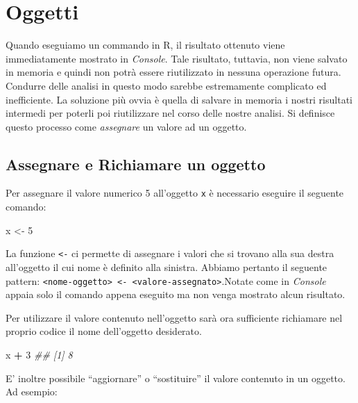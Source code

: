 \documentclass[
]{book}
\newenvironment{Shaded}{\begin{snugshade}}{\end{snugshade}}
\newcommand{\CommentTok}[1]{\textcolor[rgb]{0.56,0.35,0.01}{\textit{#1}}}
\newcommand{\DecValTok}[1]{\textcolor[rgb]{0.00,0.00,0.81}{#1}}
\newcommand{\NormalTok}[1]{#1}
\newcommand{\OperatorTok}[1]{\textcolor[rgb]{0.81,0.36,0.00}{\textbf{#1}}}
\newcommand{\StringTok}[1]{\textcolor[rgb]{0.31,0.60,0.02}{#1}}
\begin{document}
\hypertarget{objects-section}{%
\section{Oggetti}\label{objects-section}}

Quando eseguiamo un commando in R, il risultato ottenuto viene immediatamente mostrato in \emph{Console}. Tale risultato, tuttavia, non viene salvato in memoria e quindi non potrà essere riutilizzato in nessuna operazione futura. Condurre delle analisi in questo modo sarebbe estremamente complicato ed inefficiente. La soluzione più ovvia è quella di salvare in memoria i nostri risultati intermedi per poterli poi riutilizzare nel corso delle nostre analisi. Si definisce questo processo come \emph{assegnare} un valore ad un oggetto.

\hypertarget{assign}{%
\subsection{Assegnare e Richiamare un oggetto}\label{assign}}

Per assegnare il valore numerico 5 all'oggetto \texttt{x} è necessario eseguire il seguente comando:

\begin{Shaded}
\begin{Highlighting}[]
\NormalTok{x <-}\StringTok{ }\DecValTok{5}
\end{Highlighting}
\end{Shaded}

La funzione \texttt{\textless{}-} ci permette di assegnare i valori che si trovano alla sua destra all'oggetto il cui nome è definito alla sinistra. Abbiamo pertanto il seguente pattern: \texttt{\textless{}nome-oggetto\textgreater{}\ \textless{}-\ \textless{}valore-assegnato\textgreater{}}.Notate come in \emph{Console} appaia solo il comando appena eseguito ma non venga mostrato alcun risultato.

Per utilizzare il valore contenuto nell'oggetto sarà ora sufficiente richiamare nel proprio codice il nome dell'oggetto desiderato.

\begin{Shaded}
\begin{Highlighting}[]
\NormalTok{x }\OperatorTok{+}\StringTok{ }\DecValTok{3}
\CommentTok{## [1] 8}
\end{Highlighting}
\end{Shaded}

E' inoltre possibile ``aggiornare'' o ``sostituire'' il valore contenuto in un oggetto. Ad esempio:
\end{document}
